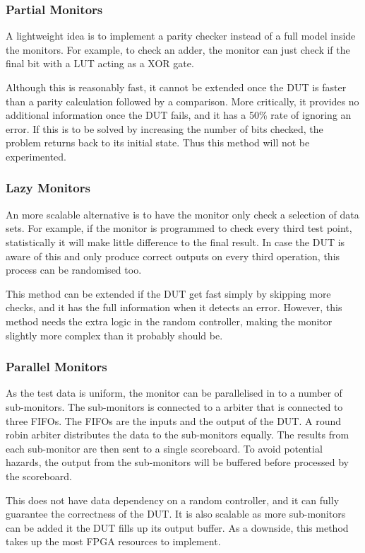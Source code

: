 \subsubsection{Partial Monitors}
A lightweight idea is to implement a parity checker instead of a full model
inside the monitors.
For example, to check an adder, the monitor can just check if the final bit
with a LUT acting as a XOR gate.

Although this is reasonably fast, it cannot be extended once the DUT is faster
than a parity calculation followed by a comparison.
More critically, it provides no additional information once the DUT fails, and
it has a 50\% rate of ignoring an error.
If this is to be solved by increasing the number of bits checked, the problem
returns back to its initial state.
Thus this method will not be experimented.

\subsubsection{Lazy Monitors}
An more scalable alternative is to have the monitor only check a selection of
data sets.
For example, if the monitor is programmed to check every third test point,
statistically it will make little difference to the final result.
In case the DUT is aware of this and only produce correct outputs on every third
operation, this process can be randomised too.

This method can be extended if the DUT get fast simply by skipping more checks,
and it has the full information when it detects an error.
However, this method needs the extra logic in the random controller, making the
monitor slightly more complex than it probably should be.

\subsubsection{Parallel Monitors}
As the test data is uniform, the monitor can be parallelised in to a number of
sub-monitors.
The sub-monitors is connected to a arbiter that is connected to three FIFOs.
The FIFOs are the inputs and the output of the DUT.
A round robin arbiter distributes the data to the sub-monitors equally.
The results from each sub-monitor are then sent to a single scoreboard.
To avoid potential hazards, the output from the sub-monitors will be buffered
before processed by the scoreboard.

This does not have data dependency on a random controller, and it can
fully guarantee the correctness of the DUT.
It is also scalable as more sub-monitors can be added it the DUT fills up its
output buffer.
As a downside, this method takes up the most FPGA resources to implement.

